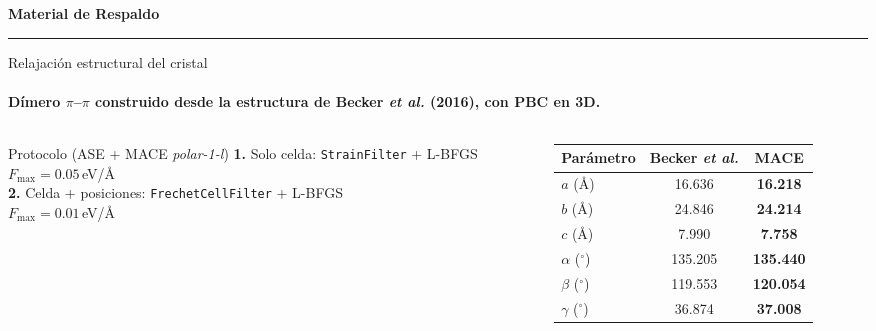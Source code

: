 \documentclass[aspectratio=169,11pt]{beamer}
\begin{document}
\appendix

\begin{frame}
  \vspace{1.2cm}
  \begin{center}
    {\huge\bfseries Material de Respaldo}\\[0.3cm]
    {\color{FisicaCyan}\rule{0.35\linewidth}{1.2pt}}
  \end{center}
\end{frame}

\begin{frame}{Relajación estructural del cristal}
  \framesubtitle{Dímero $\pi$--$\pi$ construido desde la estructura de Becker \emph{et al.} (2016), con PBC en 3D.}
  \begin{columns}[c,onlytextwidth]
    \begin{column}{0.48\textwidth}
      \begin{block}{Protocolo (ASE + MACE \textit{polar-1-l})}
        \footnotesize
        \textbf{1.} Solo celda: \texttt{StrainFilter} + L-BFGS\\
        \hspace*{1em}$F_{\max}=0.05$\,eV/\AA\\[0.3em]
        \textbf{2.} Celda + posiciones: \texttt{FrechetCellFilter} + L-BFGS\\
        \hspace*{1em}$F_{\max}=0.01$\,eV/\AA
      \end{block}
    \end{column}
    \begin{column}{0.48\textwidth}
      \centering\small
      \renewcommand{\arraystretch}{1.15}
      \begin{tabular}{@{}lcc@{}}
        \toprule
        Parámetro & Becker \emph{et al.} & \textbf{MACE} \\
        \midrule
        $a$ (\AA)           & 16.636  & \textbf{16.218} \\
        $b$ (\AA)           & 24.846  & \textbf{24.214} \\
        $c$ (\AA)           & 7.990   & \textbf{7.758} \\
        $\alpha$ ($^\circ$) & 135.205 & \textbf{135.440} \\
        $\beta$ ($^\circ$)  & 119.553 & \textbf{120.054} \\
        $\gamma$ ($^\circ$) & 36.874  & \textbf{37.008} \\
        \bottomrule
      \end{tabular}
    \end{column}
  \end{columns}
\end{frame}
\end{document}
